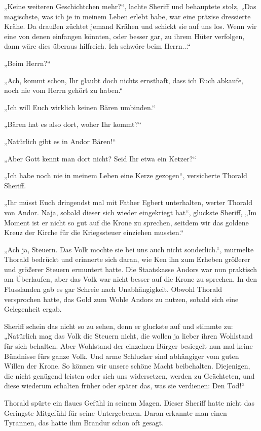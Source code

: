 \documentclass[10pt, a4paper, oneside]{book}
\begin{document}
„Keine weiteren Geschichtchen mehr?“, lachte Sheriff und behauptete stolz, „Das magischste, was ich je in meinem Leben erlebt habe, war eine präzise dressierte Krähe. Da draußen züchtet jemand Krähen und schickt sie auf uns los. Wenn wir eine von denen einfangen könnten, oder besser gar, zu ihrem Hüter verfolgen, dann wäre dies überaus hilfreich. Ich schwöre beim Herrn...“

„Beim Herrn?“

„Ach, kommt schon, Ihr glaubt doch nichts ernsthaft, dass ich Euch abkaufe, noch nie vom Herrn gehört zu haben.“

„Ich will Euch wirklich keinen Bären umbinden.“

„Bären hat es also dort, woher Ihr kommt?“

„Natürlich gibt es in Andor Bären!“

„Aber Gott kennt man dort nicht? Seid Ihr etwa ein Ketzer?“

„Ich habe noch nie in meinem Leben eine Kerze gezogen“, versicherte Thorald Sheriff.

„Ihr müsst Euch dringendst mal mit Father Egbert unterhalten, werter Thorald von Andor. Naja, sobald dieser sich wieder eingekriegt hat“, gluckste Sheriff, „Im Moment ist er nicht so gut auf die Krone zu sprechen, seitdem wir das goldene Kreuz der Kirche für die Kriegssteuer einziehen mussten.“

„Ach ja, Steuern. Das Volk mochte sie bei uns auch nicht sonderlich.“, murmelte Thorald bedrückt und erinnerte sich daran, wie Ken ihn zum Erheben größerer und größerer Steuern ermuntert hatte. Die Staatskasse Andors war nun praktisch am Überlaufen, aber das Volk war nicht besser auf die Krone zu sprechen. In den Flusslanden gab es gar Schreie nach Unabhängigkeit. Obwohl Thorald versprochen hatte, das Gold zum Wohle Andors zu nutzen, sobald sich eine Gelegenheit ergab.

Sheriff schein das nicht so zu sehen, denn er gluckste auf und stimmte zu: „Natürlich mag das Volk die Steuern nicht, die wollen ja lieber ihren Wohlstand für sich behalten. Aber Wohlstand der einzelnen Bürger besiegelt nun mal keine Bündnisse fürs ganze Volk. Und arme Schlucker sind abhängiger vom guten Willen der Krone. So können wir unsere schöne Macht beibehalten. Diejenigen, die nicht genügend leisten oder sich uns widersetzen, werden zu Geächteten, und diese wiederum erhalten früher oder später das, was sie verdienen: Den Tod!“

Thorald spürte ein flaues Gefühl in seinem Magen. Dieser Sheriff hatte nicht das Geringste Mitgefühl für seine Untergebenen. Daran erkannte man einen Tyrannen, das hatte ihm Brandur schon oft gesagt.
\end{document}
